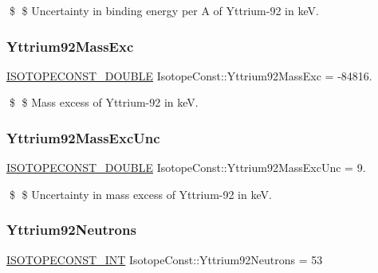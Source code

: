 \$ \$ Uncertainty in binding energy per A of Yttrium-\/92 in keV. \mbox{\label{group___isotope_const-_yttrium-_y92_ga6b7eda9d68e5a911422286c13926ed6d}} 
\subsubsection{\texorpdfstring{Yttrium92\+Mass\+Exc}{Yttrium92MassExc}}
{\footnotesize\ttfamily \mbox{\hyperlink{group___isotope_const-_macros_ga8f45a7272ce02c0b4c65c44636ed719a}{I\+S\+O\+T\+O\+P\+E\+C\+O\+N\+S\+T\+\_\+\+D\+O\+U\+B\+LE}} Isotope\+Const\+::\+Yttrium92\+Mass\+Exc = -\/84816.}

\$ \$ Mass excess of Yttrium-\/92 in keV. \mbox{\label{group___isotope_const-_yttrium-_y92_ga399c106bab3085b6657fdff8d5ed527c}} 
\subsubsection{\texorpdfstring{Yttrium92\+Mass\+Exc\+Unc}{Yttrium92MassExcUnc}}
{\footnotesize\ttfamily \mbox{\hyperlink{group___isotope_const-_macros_ga8f45a7272ce02c0b4c65c44636ed719a}{I\+S\+O\+T\+O\+P\+E\+C\+O\+N\+S\+T\+\_\+\+D\+O\+U\+B\+LE}} Isotope\+Const\+::\+Yttrium92\+Mass\+Exc\+Unc = 9.}

\$ \$ Uncertainty in mass excess of Yttrium-\/92 in keV. \mbox{\label{group___isotope_const-_yttrium-_y92_ga1a5650e5243a045c86c9111545993897}} 
\subsubsection{\texorpdfstring{Yttrium92\+Neutrons}{Yttrium92Neutrons}}
{\footnotesize\ttfamily \mbox{\hyperlink{group___isotope_const-_macros_ga5f18360b3e99483a35c32d789e62621c}{I\+S\+O\+T\+O\+P\+E\+C\+O\+N\+S\+T\+\_\+\+I\+NT}} Isotope\+Const\+::\+Yttrium92\+Neutrons = 53}

